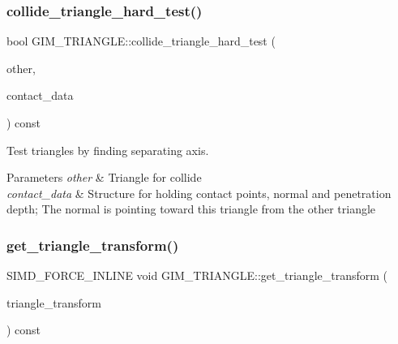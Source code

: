 \subsubsection{\texorpdfstring{collide\+\_\+triangle\+\_\+hard\+\_\+test()}{collide\_triangle\_hard\_test()}\hspace{0.1cm}{\footnotesize\ttfamily [2/2]}}
{\footnotesize\ttfamily bool G\+I\+M\+\_\+\+T\+R\+I\+A\+N\+G\+L\+E\+::collide\+\_\+triangle\+\_\+hard\+\_\+test (\begin{DoxyParamCaption}\item[{const \hyperlink{classGIM__TRIANGLE}{G\+I\+M\+\_\+\+T\+R\+I\+A\+N\+G\+LE} \&}]{other,  }\item[{\hyperlink{structGIM__TRIANGLE__CONTACT__DATA}{G\+I\+M\+\_\+\+T\+R\+I\+A\+N\+G\+L\+E\+\_\+\+C\+O\+N\+T\+A\+C\+T\+\_\+\+D\+A\+TA} \&}]{contact\+\_\+data }\end{DoxyParamCaption}) const}



Test triangles by finding separating axis. 


\begin{DoxyParams}{Parameters}
{\em other} & Triangle for collide \\
\hline
{\em contact\+\_\+data} & Structure for holding contact points, normal and penetration depth; The normal is pointing toward this triangle from the other triangle \\
\hline
\end{DoxyParams}
\mbox{\label{classGIM__TRIANGLE_a45e2c6e131c368afa12e210cf9166fbb}} 
\subsubsection{\texorpdfstring{get\+\_\+triangle\+\_\+transform()}{get\_triangle\_transform()}\hspace{0.1cm}{\footnotesize\ttfamily [1/2]}}
{\footnotesize\ttfamily S\+I\+M\+D\+\_\+\+F\+O\+R\+C\+E\+\_\+\+I\+N\+L\+I\+NE void G\+I\+M\+\_\+\+T\+R\+I\+A\+N\+G\+L\+E\+::get\+\_\+triangle\+\_\+transform (\begin{DoxyParamCaption}\item[{bt\+Transform \&}]{triangle\+\_\+transform }\end{DoxyParamCaption}) const\hspace{0.3cm}{\ttfamily [inline]}}



